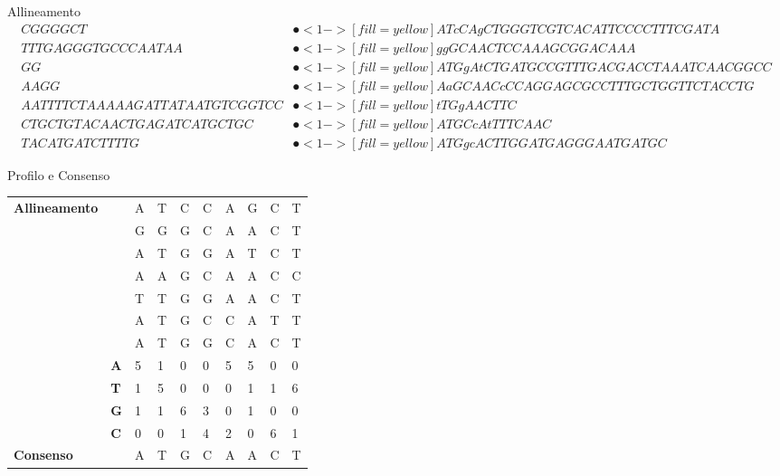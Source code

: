 \begin{frame}{Allineamento}
	\tiny\begin{align*}
		CGGGGCT&\spot<1->[fill=yellow]{ATcCAgCT}GGGTCGTCACATTCCCCTTTCGATA\\
		TTTGAGGGTGCCCAATAA&\spot<1->[fill=yellow]{ggGCAACT}CCAAAGCGGACAAA\\
		GG&\spot<1->[fill=yellow]{ATGgAtCT}GATGCCGTTTGACGACCTAAATCAACGGCC\\
		AAGG&\spot<1->[fill=yellow]{AaGCAACc}CCAGGAGCGCCTTTGCTGGTTCTACCTG\\
		AATTTTCTAAAAAGATTATAATGTCGGTCC&\spot<1->[fill=yellow]{tTGgAACT}TC\\
		CTGCTGTACAACTGAGATCATGCTGC&\spot<1->[fill=yellow]{ATGCcAtT}TTCAAC\\
		TACATGATCTTTTG&\spot<1->[fill=yellow]{ATGgcACT}TGGATGAGGGAATGATGC
	\end{align*}
\end{frame}

\begin{frame}{Profilo e Consenso}
	\begin{center}
		\begin{tabular}{l l l l l l l l l l}
			\multirow{8}{*}{\textbf{Allineamento}} & & A & T & C & C & A & G & C & T\\
			& & G & G & G & C & A & A & C & T\\
			& & A & T & G & G & A & T & C & T\\
			& & A & A & G & C & A & A & C & C\\
			& & T & T & G & G & A & A & C & T\\
			& & A & T & G & C & C & A & T & T\\
			& & A & T & G & G & C & A & C & T\\
			\hline
			\multirow{4}{*}{\textbf{Profilo}} & \textbf{A} & 5 & 1 & 0 & 0 & 5 & 5 & 0 & 0\\
			& \textbf{T} & 1 & 5 & 0 & 0 & 0 & 1 & 1 & 6\\
			& \textbf{G} & 1 & 1 & 6 & 3 & 0 & 1 & 0 & 0\\
			& \textbf{C} & 0 & 0 & 1 & 4 & 2 & 0 & 6 & 1\\
			\hline
			\textbf{Consenso} & & A & T & G & C & A & A & C & T 
		\end{tabular}
	\end{center}
\end{frame}

